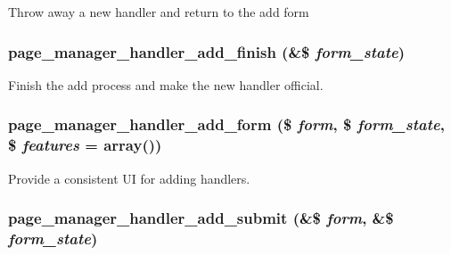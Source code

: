 \label{page__manager_8admin_8inc_a47ad5fa085b38af8dec0cc441fcc770f}
Throw away a new handler and return to the add form \hypertarget{page__manager_8admin_8inc_a412bb20e91468909a7274c948887639d}{
\subsubsection[{page\_\-manager\_\-handler\_\-add\_\-finish}]{\setlength{\rightskip}{0pt plus 5cm}page\_\-manager\_\-handler\_\-add\_\-finish (\&\$ {\em form\_\-state})}}
\label{page__manager_8admin_8inc_a412bb20e91468909a7274c948887639d}
Finish the add process and make the new handler official. \hypertarget{page__manager_8admin_8inc_ae375ef3886a3426e0c46da3e4c20fdf7}{
\subsubsection[{page\_\-manager\_\-handler\_\-add\_\-form}]{\setlength{\rightskip}{0pt plus 5cm}page\_\-manager\_\-handler\_\-add\_\-form (\$ {\em form}, \/  \$ {\em form\_\-state}, \/  \$ {\em features} = {\ttfamily array()})}}
\label{page__manager_8admin_8inc_ae375ef3886a3426e0c46da3e4c20fdf7}
Provide a consistent UI for adding handlers. \hypertarget{page__manager_8admin_8inc_a6d3b87ff0cfde1b8577f08f0ce1f96af}{
\subsubsection[{page\_\-manager\_\-handler\_\-add\_\-submit}]{\setlength{\rightskip}{0pt plus 5cm}page\_\-manager\_\-handler\_\-add\_\-submit (\&\$ {\em form}, \/  \&\$ {\em form\_\-state})}}
\label{page__manager_8admin_8inc_a6d3b87ff0cfde1b8577f08f0ce1f96af}
